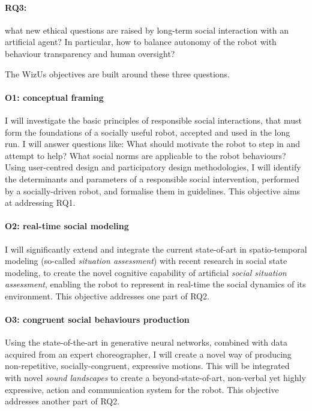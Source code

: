 \documentclass[11pt,a4paper]{report}
\newcommand{\project}{WizUs\xspace}
\begin{document}
\paragraph{\bf RQ3:} what new ethical questions are raised by long-term social interaction
        with an artificial agent? In particular, how to balance autonomy of the
        robot with behaviour transparency and human oversight?

The \project objectives are built around these three questions.

\paragraph{\bf O1: conceptual framing} I will investigate the basic principles
of responsible social interactions, that must form the foundations of a socially
useful robot, accepted and used in the long run. I will answer questions like:
What should motivate the robot to step in and attempt to help? What social norms
are applicable to the robot behaviours? Using user-centred design and
participatory design methodologies, I will identify the determinants and
parameters of a responsible social intervention, performed by a socially-driven
robot, and formalise them in guidelines. This objective aims at addressing RQ1.

\paragraph{\bf O2: real-time social modeling} I will significantly extend and integrate
the current state-of-art in spatio-temporal modeling (so-called \emph{situation
assessment}) with recent research in social state modeling, to create the novel
cognitive capability of artificial \emph{social situation assessment}, enabling
the robot to represent in real-time the social dynamics of its environment. This
objective addresses one part of RQ2.


\paragraph{\bf O3: congruent social behaviours production} Using the
state-of-the-art in generative neural networks, combined with data acquired from
an expert choreographer, I will create a novel way of producing non-repetitive,
socially-congruent, expressive motions. This will be integrated with novel
\emph{sound landscapes} to create a beyond-state-of-art, non-verbal yet highly
expressive,  action and communication system for the robot. This objective
addresses another part of RQ2.
\end{document}
